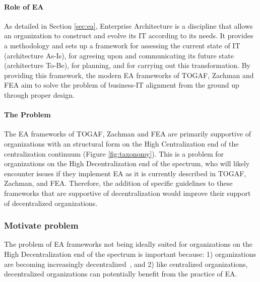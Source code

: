 
\paragraph*{Role of EA}

As detailed in Section \ref{sec:ea}, Enterprise Architecture is a discipline that allows an organization to construct and evolve its IT according to its needs. It provides a methodology and sets up a framework for assessing the current state of IT (architecture As-Is), for agreeing upon and communicating its future state (architecture To-Be), for planning, and for carrying out this transformation. By providing this framework, the modern EA frameworks of TOGAF, Zachman and FEA aim to solve the problem of business-IT alignment from the ground up through proper design. 

\paragraph*{The Problem} 

The EA frameworks of TOGAF, Zachman and FEA are primarily supportive of organizations with an structural form on the High Centralization end of the centralization continuum (Figure \ref{fig:taxonomy}). This is a problem for organizations on the High Decentralization end of the spectrum, who will likely encounter issues if they implement EA as it is currently described in TOGAF, Zachman, and FEA. Therefore, the addition of specific guidelines to these frameworks that are supportive of decentralization would improve their support of decentralized organizations. 



\subsubsection{Motivate problem} %

The problem of EA frameworks not being ideally suited for organizations on the High Decentralization end of the spectrum is important because: 1) organizations are becoming increasingly decentralized~\cite{acemoglu2007technology,fulk1995}, and 2) like centralized organizations, decentralized organizations can potentially benefit from the practice of EA.


